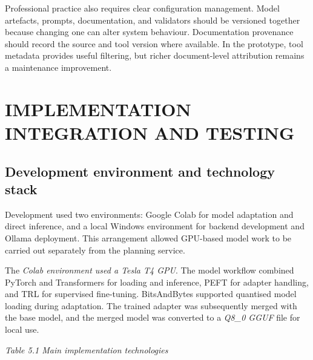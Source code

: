\documentclass[
]{article}
\begin{document}
Professional practice also requires clear configuration management.
Model artefacts, prompts, documentation, and validators should be
versioned together because changing one can alter system behaviour.
Documentation provenance should record the source and tool version where
available. In the prototype, tool metadata provides useful filtering,
but richer document-level attribution remains a maintenance improvement.

\hypertarget{implementation-integration-and-testing}{%
\section{\texorpdfstring{ IMPLEMENTATION INTEGRATION AND
TESTING}{ IMPLEMENTATION INTEGRATION AND TESTING}}\label{implementation-integration-and-testing}}

\hypertarget{development-environment-and-technology-stack}{%
\subsection{Development environment and technology
stack}\label{development-environment-and-technology-stack}}

Development used two environments: Google Colab for model adaptation and
direct inference, and a local Windows environment for backend
development and Ollama deployment. This arrangement allowed GPU-based
model work to be carried out separately from the planning service.

The \emph{Colab environment used a Tesla T4 GPU}. The model workflow
combined PyTorch and Transformers for loading and inference, PEFT for
adapter handling, and TRL for supervised fine-tuning. BitsAndBytes
supported quantised model loading during adaptation. The trained adapter
was subsequently merged with the base model, and the merged model was
converted to a \emph{Q8\_0 GGUF} file for local use.

\protect\hypertarget{_Toc242369089}{}{}\emph{Table 5.1 Main
implementation technologies}
\end{document}
